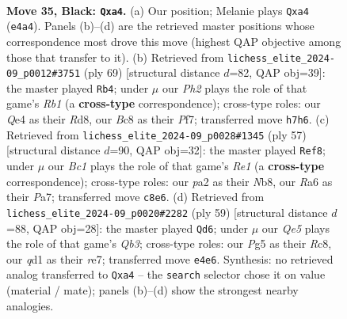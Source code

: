 \documentclass[11pt]{article}
\begin{document}
\clearpage

\begin{figure}[p]\centering
\begin{subfigure}{0.46\textwidth}\centering
\resizebox{\linewidth}{!}{%
\newchessgame
\chessboard[
  setfen={1rb2k2/1p5p/r2n4/2R3p1/N3q3/4P1P1/P4P1P/B2QR1K1 b - - 6 35},
  showmover=false,
  pgfstyle=straightmove, color=movearrow, markmove={e4-a4}
]}
\caption{}
\end{subfigure}\hfill
\begin{subfigure}{0.46\textwidth}\centering
\resizebox{\linewidth}{!}{%
\newchessgame
\chessboard[
  setfen={1r1r2k1/4npp1/6qp/4P3/3PN3/1P5P/5RP1/3QR1K1 b - - 2 35},
  showmover=false,
  pgfstyle=straightmove, color=movearrow, markmove={b8-b4}
]}
\caption{}
\end{subfigure}
\\[4pt]
\begin{subfigure}{0.46\textwidth}\centering
\resizebox{\linewidth}{!}{%
\newchessgame
\chessboard[
  setfen={1n2r3/p1k5/2pq1rp1/7p/3P4/3Q2P1/PP3PBP/2RR2K1 b - - 1 29},
  showmover=false,
  pgfstyle=straightmove, color=movearrow, markmove={e8-f8}
]}
\caption{}
\end{subfigure}\hfill
\begin{subfigure}{0.46\textwidth}\centering
\resizebox{\linewidth}{!}{%
\newchessgame
\chessboard[
  setfen={2r3k1/1p2R1p1/pq4r1/8/3P3n/1PP3NP/1Q3Pb1/1R4K1 b - - 1 30},
  showmover=false,
  pgfstyle=straightmove, color=movearrow, markmove={b6-d6}
]}
\caption{}
\end{subfigure}
\caption{\textbf{Move 35, Black: \texttt{Qxa4}.} (a) Our position; Melanie plays \texttt{Qxa4} (\texttt{e4a4}). Panels (b)--(d) are the retrieved master positions whose correspondence most drove this move (highest QAP objective among those that transfer to it). (b) Retrieved from \texttt{lichess\_elite\_2024-09\_p0012\#3751} (ply 69) [structural distance $d$=82, QAP obj=39]: the master played \texttt{Rb4}; under $\mu$ our \emph{Ph2} plays the role of that game's \emph{Rb1} (a \textbf{cross-type} correspondence); cross-type roles: our \emph{Q}e4 as their \emph{R}d8, our \emph{B}c8 as their \emph{P}f7; transferred move \texttt{h7h6}. (c) Retrieved from \texttt{lichess\_elite\_2024-09\_p0028\#1345} (ply 57) [structural distance $d$=90, QAP obj=32]: the master played \texttt{Ref8}; under $\mu$ our \emph{Bc1} plays the role of that game's \emph{Re1} (a \textbf{cross-type} correspondence); cross-type roles: our \emph{p}a2 as their \emph{N}b8, our \emph{R}a6 as their \emph{P}a7; transferred move \texttt{c8e6}. (d) Retrieved from \texttt{lichess\_elite\_2024-09\_p0020\#2282} (ply 59) [structural distance $d$=88, QAP obj=28]: the master played \texttt{Qd6}; under $\mu$ our \emph{Qe5} plays the role of that game's \emph{Qb3}; cross-type roles: our \emph{P}g5 as their \emph{R}c8, our \emph{q}d1 as their \emph{r}e7; transferred move \texttt{e4e6}. Synthesis: no retrieved analog transferred to \texttt{Qxa4} -- the \texttt{search} selector chose it on value (material / mate); panels (b)--(d) show the strongest nearby analogies.}
\label{fig:thought-m69}
\end{figure}
\end{document}
